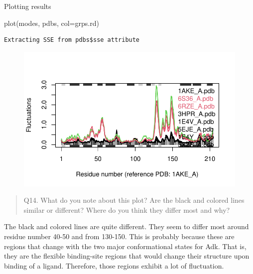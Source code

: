 \documentclass[
  letterpaper,
  DIV=11,
  numbers=noendperiod]{scrartcl}
\newenvironment{Shaded}{\begin{snugshade}}{\end{snugshade}}
\newcommand{\AttributeTok}[1]{\textcolor[rgb]{0.40,0.45,0.13}{#1}}
\newcommand{\FunctionTok}[1]{\textcolor[rgb]{0.28,0.35,0.67}{#1}}
\newcommand{\NormalTok}[1]{\textcolor[rgb]{0.00,0.23,0.31}{#1}}
\begin{document}
Plotting results

\begin{Shaded}
\begin{Highlighting}[]
\FunctionTok{plot}\NormalTok{(modes, pdbs, }\AttributeTok{col=}\NormalTok{grps.rd)}
\end{Highlighting}
\end{Shaded}

\begin{verbatim}
Extracting SSE from pdbs$sse attribute
\end{verbatim}

\begin{figure}[H]

{\centering \includegraphics{class09_files/figure-pdf/unnamed-chunk-20-1.pdf}

}

\end{figure}

\begin{quote}
Q14. What do you note about this plot? Are the black and colored lines
similar or different? Where do you think they differ most and why?
\end{quote}

The black and colored lines are quite different. They seem to differ
most around residue number 40-50 and from 130-150. This is probably
because these are regions that change with the two major conformational
states for Adk. That is, they are the flexible binding-site regions that
would change their structure upon binding of a ligand. Therefore, those
regions exhibit a lot of fluctuation.
\end{document}

